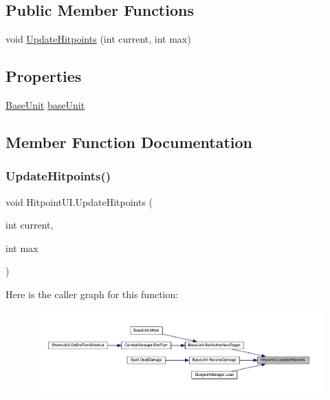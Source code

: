 \subsection*{Public Member Functions}
\begin{DoxyCompactItemize}
\item 
void \mbox{\hyperlink{class_hitpoint_u_i_a276f8fb6a38204f4155f32c48c6322af}{Update\+Hitpoints}} (int current, int max)
\end{DoxyCompactItemize}
\subsection*{Properties}
\begin{DoxyCompactItemize}
\item 
\mbox{\hyperlink{class_base_unit}{Base\+Unit}} \mbox{\hyperlink{class_hitpoint_u_i_a6dfd0f75896f8f70dc7f2dc0ff34fb42}{base\+Unit}}
\end{DoxyCompactItemize}


\subsection{Member Function Documentation}
\mbox{\label{class_hitpoint_u_i_a276f8fb6a38204f4155f32c48c6322af}} 
\subsubsection{\texorpdfstring{UpdateHitpoints()}{UpdateHitpoints()}}
{\footnotesize\ttfamily void Hitpoint\+U\+I.\+Update\+Hitpoints (\begin{DoxyParamCaption}\item[{int}]{current,  }\item[{int}]{max }\end{DoxyParamCaption})}

Here is the caller graph for this function\+:
\nopagebreak
\begin{figure}[H]
\begin{center}
\leavevmode
\includegraphics[width=350pt]{class_hitpoint_u_i_a276f8fb6a38204f4155f32c48c6322af_icgraph}
\end{center}
\end{figure}


